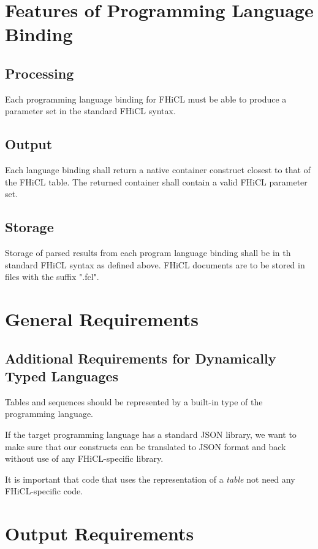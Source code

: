\documentclass{article}
\begin{document}
\section{Features of Programming Language Binding}
        \subsection{Processing}
                Each programming language binding for FHiCL must be able to produce a parameter set
                in the standard FHiCL syntax. 
        
        \subsection{Output}
                Each language binding shall return a native container construct closest to that of the FHiCL table.
                The returned container shall contain a valid FHiCL parameter set.

        \subsection{Storage}    
                Storage of parsed results from each program language binding shall be in th standard FHiCL syntax as defined above.
                FHiCL documents are to be stored in files with the suffix ".fcl".
                
\section{General Requirements}
        \subsection{Additional Requirements for Dynamically Typed Languages}
                Tables and sequences should be represented by a built-in type of the
                programming language.

                If the target programming language has a standard JSON library, we
                want to make sure that our constructs can be translated to JSON format
                and back without use of any FHiCL-specific library.

                It is important that code that uses the representation of a
                \emph{table} not need any FHiCL-specific code.

\section{Output Requirements}
\end{document}
